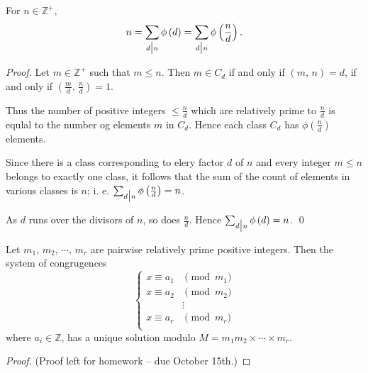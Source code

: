 \begin{theorem}
    For $n \in \mathbb{Z}^+$,
    \[
        n = \sum_{d \bigm| n} \phi\left(d\right) = \sum_{d \bigm| n} \phi\left(\frac{n}{d}\right).
    \]
\end{theorem}

\begin{proof}
    Let $m \in \mathbb{Z}^+$ such that $m \leq n$.
    Then $m \in C_d$ if and only if $\left(m,\,n\right)=d$, if and only if $\left(\frac{m}{d},\,\frac{n}{d}\right)=1$.

    Thus the number of positive integers $\leq\frac{n}{d}$ which are relatively prime to $\frac{n}{d}$
    is equlal to the number og elements $m$ in $C_d$.
    Hence each class $C_d$ has $\phi\left(\frac{n}{d}\right)$ elements.

    Since there is a class corresponding to elery factor $d$ of $n$ and every integer $m\leq n$ belongs to
    exactly one class, it follows that the sum of the count of elements in various classes is $n$;
    i. e. $\sum_{d \bigm| n} \phi\left(\frac{n}{d}\right)=n$.

    As $d$ runs over the divisors of $n$, so does $\frac{n}{d}$.
    Hence $\sum_{d \bigm| n} \phi\left(d\right)=n$.
    \qed 
\end{proof}

\begin{theorem}
    Let $m_1,\,m_2,\,\cdots,\,m_r$ are pairwise relatively prime positive integers.
    Then the system of congrugences
    \[
        \begin{cases}
            x\equiv a_1 & \pmod{m_1} \\
            x\equiv a_2 & \pmod{m_2} \\
            & \vdots \\
            x\equiv a_r & \pmod{m_r} \\
        \end{cases}
    \]
    where $a_i \in \mathbb{Z}$, has a unique solution modulo $M=m_1m_2\times\cdots\times m_r$.
\end{theorem}

\begin{proof}
    (Proof left for homework -- due October 15th.)
\end{proof}


